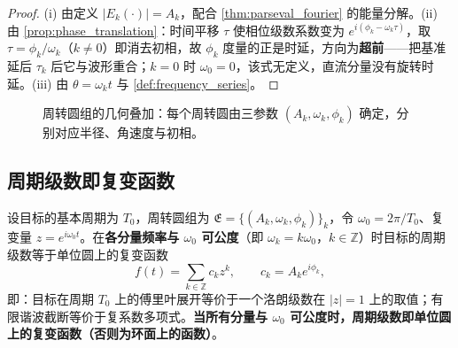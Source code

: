 \begin{proof}
(i) 由定义 $|E_k(\cdot)|=A_k$，配合 \cref{thm:parseval_fourier} 的能量分解。(ii) 由 \cref{prop:phase_translation}：时间平移 $\tau$ 使相位级数系数变为 $e^{i(\phi_k-\omega_k\tau)}$，取 $\tau=\phi_k/\omega_k$（$k\ne0$）即消去初相，故 $\phi_k$ 度量的正是时延，方向为\textbf{超前}——把基准延后 $\tau_k$ 后它与波形重合；$k=0$ 时 $\omega_0=0$，该式无定义，直流分量没有旋转时延。(iii) 由 $\theta=\omega_kt$ 与 \cref{def:frequency_series}。
\end{proof}

\begin{figure}[htbp]
\centering
{}
\caption{周转圆组的几何叠加：每个周转圆由三参数 $(A_k,\omega_k,\phi_k)$ 确定，分别对应半径、角速度与初相。}
\label{fig:ps_epicycle_geometry}
\end{figure}

\subsection{周期级数即复变函数}

\begin{theorem}[周期级数的复变函数表示]\label{thm:ps_series_complex_function}
设目标的基本周期为 $T_0$，周转圆组为 $\mathfrak{E}=\{(A_k,\omega_k,\phi_k)\}_k$，令 $\omega_0=2\pi/T_0$、复变量 $z=e^{i\omega_0t}$。在\textbf{各分量频率与 $\omega_0$ 可公度}（即 $\omega_k=k\omega_0$，$k\in\mathbb Z$）时目标的周期级数等于单位圆上的复变函数
\[
f(t)=\sum_{k\in\mathbb{Z}}c_kz^k,\qquad c_k=A_ke^{i\phi_k},
\]
即：目标在周期 $T_0$ 上的傅里叶展开等价于一个洛朗级数在 $|z|=1$ 上的取值；有限谐波截断等价于复系数多项式。\textbf{当所有分量与 $\omega_0$ 可公度时，周期级数即单位圆上的复变函数（否则为环面上的函数）}。
\end{theorem}

